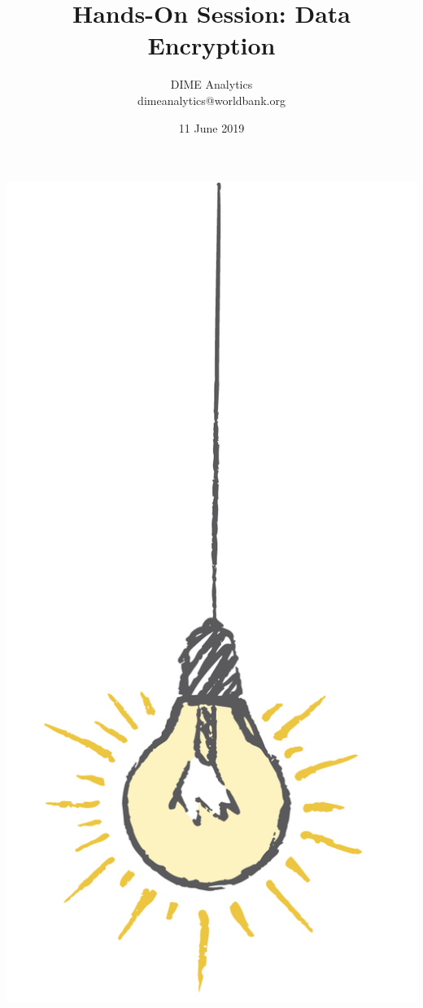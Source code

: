 \documentclass{tufte-handout}
\title{Hands-On Session: Data Encryption}
\author{DIME Analytics \\ dimeanalytics@worldbank.org}
\date{11 June 2019}  %
\begin{document}
\maketitle%

\begin{marginfigure}%
  \includegraphics[width=\linewidth]{img/light.png}
\end{marginfigure}
\end{document}
